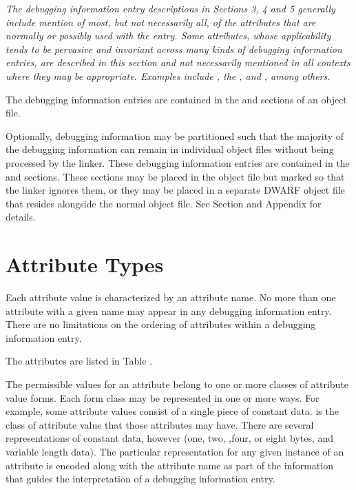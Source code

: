 \textit{The debugging information entry descriptions 
in Sections 3, 4 and 5 generally include mention of
most, but not necessarily all, of the attributes 
that are normally or possibly used with the entry.
Some attributes, whose applicability tends to be 
pervasive and invariant across many kinds of
debugging information entries, are described in 
this section and not necessarily mentioned in all
contexts where they may be appropriate. 
Examples include 
\DWATartificial, 
the , and 
\DWATdescription, 
among others.}

The debugging information entries are contained 
in the \dotdebuginfo{} and 
\dotdebugtypes{}
sections of an object file.

Optionally, debugging information may be partitioned such
that the majority of the debugging information can remain in
individual object files without being processed by the
linker. These debugging information entries are contained in
the \dotdebuginfodwo{} and \dotdebugtypesdwo{} sections. These
sections may be placed in the object file but marked so that
the linker ignores them, or they may be placed in a separate
DWARF object file that resides alongside the normal object
file. See Section  and
Appendix  for details.


\section{Attribute Types}
\label{chap:attributetypes}
Each attribute value is characterized by an attribute name. 
No more than one attribute with a given name may appear in any
debugging information entry. 
There are no limitations on the
ordering of attributes within a debugging information entry.

The attributes are listed in Table .  

The permissible values
for an attribute belong to one or more classes of attribute
value forms.  
Each form class may be represented in one or more ways. 
For example, some attribute values consist
of a single piece of constant data. 
is the class of attribute value that those attributes may have. 
There are several representations of constant data,
however (one, two, ,four, or eight bytes, and variable length
data). 
The particular representation for any given instance
of an attribute is encoded along with the attribute name as
part of the information that guides the interpretation of a
debugging information entry.  

